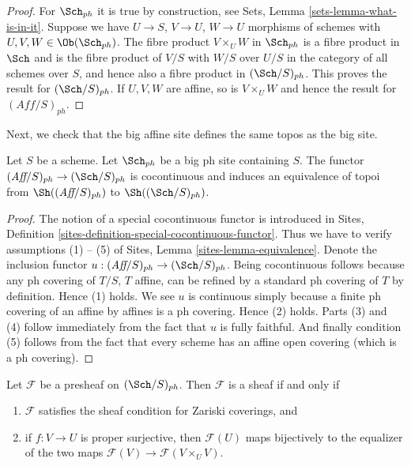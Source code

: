 \begin{proof}
For $\Sch_{ph}$ it is true by construction, see
Sets, Lemma \ref{sets-lemma-what-is-in-it}.
Suppose we have $U \to S$, $V \to U$, $W \to U$ morphisms
of schemes with $U, V, W \in \Ob(\Sch_{ph})$.
The fibre product $V \times_U W$ in $\Sch_{ph}$
is a fibre product in $\Sch$ and
is the fibre product of $V/S$ with $W/S$ over $U/S$ in
the category of all schemes over $S$, and hence also a
fibre product in $(\Sch/S)_{ph}$.
This proves the result for $(\Sch/S)_{ph}$.
If $U, V, W$ are affine, so is $V \times_U W$ and hence the
result for $(\textit{Aff}/S)_{ph}$.
\end{proof}

\noindent
Next, we check that the big affine site defines the same
topos as the big site.

\begin{lemma}
\label{lemma-affine-big-site-ph}
Let $S$ be a scheme. Let $\Sch_{ph}$ be a big ph
site containing $S$.
The functor $(\textit{Aff}/S)_{ph} \to (\Sch/S)_{ph}$
is cocontinuous and induces an equivalence of topoi from
$\Sh((\textit{Aff}/S)_{ph})$ to
$\Sh((\Sch/S)_{ph})$.
\end{lemma}

\begin{proof}
The notion of a special cocontinuous functor is introduced in
Sites, Definition \ref{sites-definition-special-cocontinuous-functor}.
Thus we have to verify assumptions (1) -- (5) of
Sites, Lemma \ref{sites-lemma-equivalence}.
Denote the inclusion functor
$u : (\textit{Aff}/S)_{ph} \to (\Sch/S)_{ph}$.
Being cocontinuous follows because any ph covering of
$T/S$, $T$ affine, can be refined by a standard ph covering of $T$
by definition. Hence (1) holds. We see $u$ is continuous simply
because a finite ph covering of an affine by affines is a ph covering.
Hence (2) holds.
Parts (3) and (4) follow immediately from the fact that $u$ is
fully faithful. And finally condition (5) follows from the
fact that every scheme has an affine open covering (which is
a ph covering).
\end{proof}

\begin{lemma}
\label{lemma-characterize-sheaf}
Let $\mathcal{F}$ be a presheaf on $(\Sch/S)_{ph}$.
Then $\mathcal{F}$ is a sheaf if and only if
\begin{enumerate}
\item $\mathcal{F}$ satisfies the sheaf condition for
Zariski coverings, and
\item if $f : V \to U$ is proper surjective, then
$\mathcal{F}(U)$ maps bijectively to the equalizer
of the two maps $\mathcal{F}(V) \to \mathcal{F}(V \times_U V)$.
\end{enumerate}
\end{lemma}

